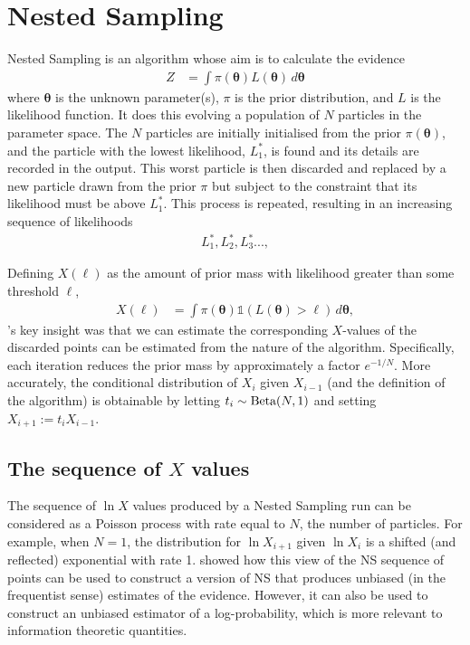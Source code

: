 \documentclass[entropy,article,accept,oneauthor,pdftex,10pt,a4paper]{mdpi}
\newcommand{\x}{\boldsymbol{\theta}}
\begin{document}
\section{Nested Sampling}

Nested Sampling \citep[NS][]{skilling2006nested} is an algorithm whose aim is
to calculate the evidence
\begin{align}
Z &= \int \pi(\x) L(\x) \, d\x
\end{align}
where $\x$ is the unknown parameter(s), $\pi$ is the prior distribution,
and $L$ is the likelihood function. It does this evolving a population of
$N$ particles in the parameter space.
The $N$ particles are initially initialised from the prior $\pi(\x)$, and the
particle with the lowest likelihood, $L^*_1$, is found and its details are
recorded in the output. This worst particle is then discarded
and replaced by a new particle
drawn from the prior $\pi$ but subject to the constraint that its likelihood
must be above $L^*_1$. This process is repeated, resulting in an
increasing sequence of likelihoods
\begin{align}
L^*_1, L^*_2, L^*_3..., 
\end{align}

Defining $X(\ell)$ as the amount of prior mass with likelihood greater than
some threshold $\ell$,
\begin{align}
X(\ell) &= \int \pi(\x) \mathds{1}\left(L(\x) > \ell\right) \, d\x,
\end{align}
\citet{skilling}'s key insight was that we can estimate the corresponding
$X$-values of the discarded points can be estimated from the nature of the
algorithm. Specifically, each iteration reduces the prior mass by approximately
a factor $e^{-1/N}$. More accurately, the conditional distribution of
$X_{i}$ given $X_{i-1}$ (and the definition of the algorithm)
is obtainable by letting
$t_i \sim \textnormal{Beta}(N,1)$ and setting $X_{i+1} := t_iX_{i-1}$.

\subsection{The sequence of $X$ values}

The sequence of $\ln X$ values produced by a Nested Sampling run can be
considered as a Poisson process with rate equal to $N$, the number of
particles. For example, when $N=1$, the distribution for $\ln X_{i+1}$
given $\ln X_i$ is a shifted (and reflected) exponential with rate 1.
\citet{Walter2015} showed how this view of the NS sequence of points
can be used to construct a
version of NS that produces unbiased (in the frequentist sense)
estimates of the evidence.
However, it can also be used to construct an unbiased estimator of
a log-probability, which is more relevant to information theoretic
quantities.
\end{document}
